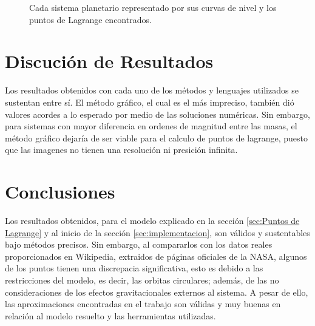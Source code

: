 \begin{figure}[H]
\caption{Cada sistema planetario representado por sus curvas de nivel y los puntos de Lagrange encontrados.}
\label{superficie, cn, plane s-j}
\end{figure}



\section{Discución de Resultados}
\label{sec:discucion}

Los resultados obtenidos con cada uno de los métodos y lenguajes utilizados se sustentan entre sí. El método gráfico, el cual es el más impreciso, también dió valores acordes a lo esperado por medio de las soluciones numéricas. Sin embargo, para sistemas con mayor diferencia en ordenes de magnitud entre las masas, el método gráfico dejaría de ser viable para el calculo de puntos de lagrange, puesto que las imagenes no tienen una resolución ni presición infinita.


\section{Conclusiones}
\label{sec:conclusiones}

Los resultados obtenidos, para el modelo explicado en la sección \ref{sec:Puntos de Lagrange} y al inicio de la sección \ref{sec:implementacion}, son válidos y sustentables bajo métodos precisos. Sin embargo, al compararlos con los datos reales proporcionados en Wikipedia, extraidos de páginas oficiales de la NASA, algunos de los puntos tienen una discrepacia significativa, esto es debido a las restricciones del modelo, es decir, las orbitas circulares; además, de las no consideraciones de los efectos gravitacionales externos al sistema. A pesar de ello, las aproximaciones encontradas en el trabajo son válidas y muy buenas en relación al modelo resuelto y las herramientas utilizadas.


